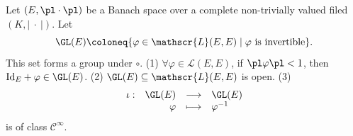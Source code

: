 \begin{theoremenv}
    Let $(E,\pl\cdot\pl)$ be a Banach space over a complete non-trivially valued filed $(K,\left| \ \cdot\ \right|)$. Let 
    $$ \GL (E)\coloneq \{\varphi\in \mathscr{L}(E,E)\mid \varphi \text{ is invertible}\}.$$
    This set forms a group under $\circ$.
    \newline
    (1) $\forall \varphi\in \mathscr{L}(E,E)$, if $\pl \varphi\pl<1$, then $\mathrm{Id}_E+\varphi\in \GL(E)$.
    \newline
    (2) $\GL(E)\subseteq \mathscr{L}(E,E)$ is open.
    \newline
    (3) $$\begin{array}{rrcl}
        \iota:& \GL(E)&\longrightarrow &\GL(E)\\
        &\varphi&\longmapsto &\varphi^{-1}
    \end{array}$$ is of class $\mathcal{C}^{\infty}$.
\end{theoremenv}
